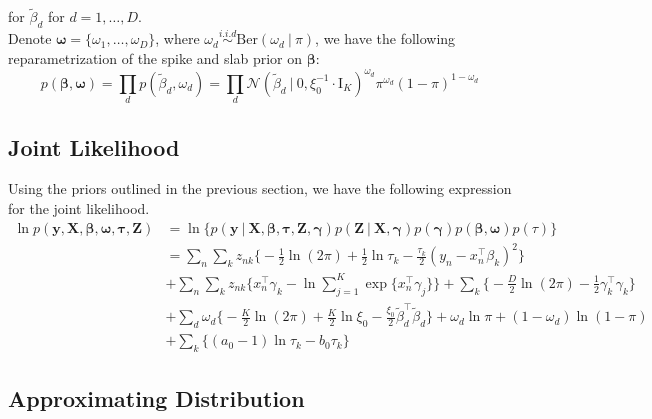 \documentclass[twoside,11pt]{article}
\newcommand\given[1][]{\:#1\vert\:}
\newcommand{\transpose}[1]{#1^{\intercal}}
\newcommand{\nsum}{\sum\limits_{n}}
\newcommand{\ksum}{\sum\limits_{k}}
\newcommand{\boldbeta}{\boldsymbol\beta}
\newcommand{\boldgamma}{\boldsymbol\gamma}
\newcommand{\boldtau}{\boldsymbol\tau}
\newcommand{\sumexp}{\sum_{j=1}^{K} \exp \{ \transpose{x_n} \gamma_j \}}
\newcommand{\iid}{\overset{i.i.d}{\sim}}
\newcommand{\betad}{\tilde{\beta}_d}
\newcommand{\priorbeta}{\mathcal{N} \left( \betad \given 0, \xi_0^{-1} \cdot \mathrm{I}_K \right)}
\newcommand{\pr}[1]{p \left( #1 \right)}
\begin{document}
for $\betad$ for $d = 1, \ldots, D$. \\

Denote $\boldsymbol \omega = \{ \omega_1, \ldots, \omega_D\}$, where $\omega_d \iid \mathrm{Ber}(\omega_d \given \pi)$, we have the following reparametrization of the spike and slab prior on $\boldbeta$:
\begin{equation} \label{eq:beta_joint_prior_vs}
	\pr{\boldbeta, \boldsymbol\omega} = \prod_{d} \pr{\betad, \omega_d} = \prod_{d} \priorbeta^{\omega_d} \pi^{\omega_d} (1-\pi)^{1 - \omega_d}
\end{equation}

\subsection{Joint Likelihood}
Using the priors outlined in the previous section, we have the following expression for the joint likelihood. 
\begin{equation} \label{eq:joint_vs}
\begin{split}
	\ln  \pr{\mathbf{y}, \mathbf{X}, \boldbeta, \boldsymbol\omega, \boldtau, \mathbf{Z}} &= 
	\ln \bigg\{\pr{\mathbf{y} \given \mathbf{X}, \boldsymbol\beta, \boldsymbol{\tau}, \mathbf{Z}, \boldsymbol\gamma}\pr{\mathbf{Z}\given \mathbf{X}, \boldgamma}\pr{\boldgamma}\pr{\boldbeta, \boldsymbol\omega}\pr{\tau} \bigg\}\\
	&= \nsum \ksum z_{nk}\bigg\{ -\frac{1}{2}\ln(2\pi) + \frac{1}{2} \ln \tau_k - \frac{\tau_k}{2} \left( y_n - \transpose{x_n}\beta_k\right)^2 \bigg\} \\
	& + \nsum \ksum z_{nk} \bigg\{ \transpose{x_n} \gamma_k - \ln \sumexp  \bigg\} + \ksum \bigg\{ -\frac{D}{2} \ln (2\pi) - \frac{1}{2} \transpose{\gamma_k}\gamma_k \bigg\} \\
	& + \sum_{d} \omega_d \bigg\{ -\frac{K}{2} \ln(2\pi) + \frac{K}{2} \ln \xi_0 - \frac{\xi_0}{2} \transpose{\betad} \betad\bigg\} + \omega_d \ln \pi + ( 1- \omega_d) \ln(1 - \pi) \\
	& + \ksum \bigg\{ (a_0 - 1) \ln \tau_k - b_0 \tau_k \bigg\}
\end{split}
\end{equation}


\subsection{Approximating Distribution}

\end{document}
